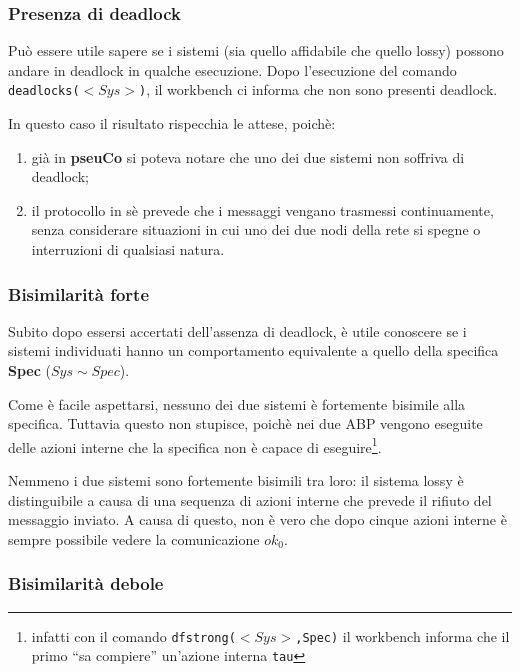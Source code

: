 \subsubsection{Presenza di deadlock}

Può essere utile sapere se i sistemi (sia quello affidabile che quello lossy)
possono andare in deadlock in qualche esecuzione. Dopo l'esecuzione del comando
\texttt{deadlocks(}$<Sys>$\texttt{)}, il workbench ci informa che non sono
presenti deadlock.

In questo caso il risultato rispecchia le attese, poichè:

\begin{enumerate}
  \item già in \textbf{pseuCo} si poteva notare che uno dei due sistemi non
    soffriva di deadlock;
  \item il protocollo in sè prevede che i messaggi vengano trasmessi
    continuamente, senza considerare situazioni in cui uno dei due nodi
    della rete si spegne o interruzioni di qualsiasi natura.
\end{enumerate}

\subsubsection{Bisimilarità forte}

Subito dopo essersi accertati dell'assenza di deadlock, è utile conoscere se i
sistemi individuati hanno un comportamento equivalente a quello della
specifica \textbf{Spec} ($Sys \sim Spec$).

Come è facile aspettarsi, nessuno dei due sistemi è fortemente bisimile alla
specifica. Tuttavia questo non stupisce, poichè nei due ABP vengono eseguite
delle azioni interne che la specifica non è capace di
eseguire\footnote{infatti con il comando
\texttt{dfstrong(}$<Sys>$\texttt{,Spec)} il workbench informa che il primo
``sa compiere'' un'azione interna \texttt{tau}}.

Nemmeno i due sistemi sono fortemente bisimili tra loro: il sistema lossy è
distinguibile a causa di una sequenza di azioni interne che prevede il rifiuto
del messaggio inviato. A causa di questo, non è vero che dopo cinque azioni
interne è sempre possibile vedere la comunicazione \texttt{$ok_0$}.

\subsubsection{Bisimilarità debole}

